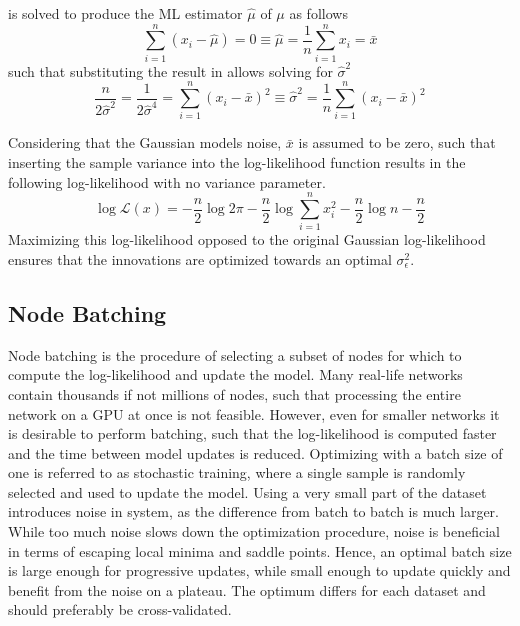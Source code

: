          is solved to produce the ML estimator $\hat{\mu}$ of $\mu$ as follows
        \begin{equation}
            \sum_{i=1}^n(x_i-\hat{\mu}) = 0 \equiv \hat{\mu}=\frac{1}{n}\sum_{i=1}^n x_i = \bar{x}
        \end{equation}
        such that substituting the result in  allows solving for $\hat{\sigma}^2$
        \begin{equation}
            \frac{n}{2\hat{\sigma}^2} = \frac{1}{2\hat{\sigma}^4} = \sum_{i=1}^n (x_i-\bar{x})^2 \equiv \hat{\sigma}^2=\frac{1}{n}\sum_{i=1}^n (x_i-\bar{x})^2
        \end{equation}
        
        Considering that the Gaussian models noise, $\bar{x}$ is assumed to be zero, such that inserting the sample variance into the log-likelihood function results in the following log-likelihood with no variance parameter.
        \begin{equation}
            \log\mathcal{L}(x)=-\frac{n}{2}\log 2\pi -\frac{n}{2}\log\sum_{i=1}^n x_i^2-\frac{n}{2}\log n-\frac{n}{2}
        \end{equation}
        Maximizing this log-likelihood opposed to the original Gaussian log-likelihood ensures that the innovations are optimized towards an optimal $\sigma_\epsilon^2$.
    
\subsection{Node Batching}

    Node batching is the procedure of selecting a subset of nodes for which to compute the log-likelihood and update the model. Many real-life networks contain thousands if not millions of nodes, such that processing the entire network on a GPU at once is not feasible. However, even for smaller networks it is desirable to perform batching, such that the log-likelihood is computed faster and the time between model updates is reduced. Optimizing with a batch size of one is referred to as stochastic training, where a single sample is randomly selected and used to update the model. Using a very small part of the dataset introduces noise in system, as the difference from batch to batch is much larger. While too much noise slows down the optimization procedure, noise is beneficial in terms of escaping local minima and saddle points. Hence, an optimal batch size is large enough for progressive updates, while small enough to update quickly and benefit from the noise on a plateau. The optimum differs for each dataset and should preferably be cross-validated.
    
